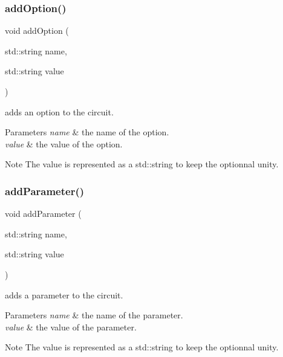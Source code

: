 \subsubsection{\texorpdfstring{add\+Option()}{addOption()}}
{\footnotesize\ttfamily void add\+Option (\begin{DoxyParamCaption}\item[{std\+::string}]{name,  }\item[{std\+::string}]{value }\end{DoxyParamCaption})}



adds an option to the circuit. 


\begin{DoxyParams}{Parameters}
{\em name} & the name of the option. \\
\hline
{\em value} & the value of the option.\\
\hline
\end{DoxyParams}
\begin{DoxyNote}{Note}
The value is represented as a std\+::string to keep the optionnal unity. 
\end{DoxyNote}
\mbox{\label{class_s_p_i_c_e_1_1_circuit_ab3ab147a16bc490ce96db905a4ca271c}} 
\subsubsection{\texorpdfstring{add\+Parameter()}{addParameter()}}
{\footnotesize\ttfamily void add\+Parameter (\begin{DoxyParamCaption}\item[{std\+::string}]{name,  }\item[{std\+::string}]{value }\end{DoxyParamCaption})}



adds a parameter to the circuit. 


\begin{DoxyParams}{Parameters}
{\em name} & the name of the parameter. \\
\hline
{\em value} & the value of the parameter.\\
\hline
\end{DoxyParams}
\begin{DoxyNote}{Note}
The value is represented as a std\+::string to keep the optionnal unity. 
\end{DoxyNote}
\mbox{\label{class_s_p_i_c_e_1_1_circuit_a627cf18c2763bb59f3d7e5142873251c}} 
